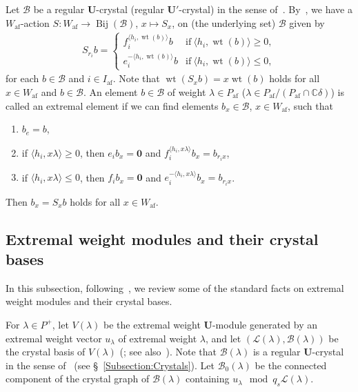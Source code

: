 \documentclass[ALCO,ThmDefs,Unicode,epreuves]{cedram}
\newcommand{\BC}{\mathbb{C}}
\newcommand\bm[1]{\boldsymbol{#1}}
\renewcommand{\U}{\mathbf{U}}
\DeclareMathOperator{\af}{af}
\DeclareMathOperator{\wt}{wt}
\DeclareMathOperator{\Bij}{Bij}
\begin{document}
Let 
$\mathcal{B}$ 
be a regular $\U$-crystal (\resp regular $\U'$-crystal) in the sense of~\cite[\S~2.2]{K02}. 
By~\cite[\S~7]{K94}, 
we have a $W_{\af}$-action 
$S : W_{\af} \rightarrow \Bij(\mathcal{B})$, $x \mapsto S_x$, 
on (the underlying set) 
$\mathcal{B}$
given by
\begin{align} \label{eq:W-action}
S_{r_i} b
=
\begin{cases}
f_i^{\langle h_i , \wt (b) \rangle} b & \text{if}\ \langle h_i , \wt (b) \rangle \geq 0, \\%
e_i^{-\langle h_i , \wt (b) \rangle} b & \text{if}\ \langle h_i , \wt (b) \rangle \leq 0, 
\end{cases}
\end{align}
for each 
$b \in \mathcal{B}$ 
and 
$i \in I_{\af}$. 
Note that 
$\wt (S_x b) = x \wt (b)$ 
holds for all
$x \in W_{\af}$ and $b \in \mathcal{B}$. 
An element 
$b \in \mathcal{B}$ 
of weight 
$\lambda \in P_{\af}$
(\resp $\lambda \in P_{\af} / (P_{\af} \cap \BC \delta)$)
is called an extremal element if we can find elements
$b_x \in \mathcal{B}$, $x \in W_{\af}$, 
such that 
\begin{enumerate}[label=(E\arabic*)]
\item
$b_e = b$, 
\item
if 
$\langle h_i , x\lambda \rangle \geq 0$, 
then
$e_i b_x = \bm{0}$
and 
$f_i^{\langle h_i , x\lambda \rangle} b_x = b_{r_i x}$, 
\item
if 
$\langle h_i , x\lambda \rangle \leq 0$, 
then
$f_i b_x = \bm{0}$
and 
$e_i^{-\langle h_i , x\lambda \rangle} b_x = b_{r_i x}$. 
\end{enumerate}
Then 
$b_x = S_x b$
holds for all 
$x \in W_{\af}$.

\subsection{Extremal weight modules and their crystal bases} \label{Subsection:extremal}

In this subsection, 
following~\cite{BN04,K94,K02}, 
we review some of the standard facts on 
extremal weight modules and their crystal bases.

For 
$\lambda \in P^+$, 
let 
$V(\lambda)$ 
be the extremal weight $\U$-module generated by an extremal weight vector 
$u_{\lambda}$ 
of extremal weight 
$\lambda$, 
and let 
$(\mathcal{L}(\lambda) , \mathcal{B}(\lambda))$ 
be the crystal basis of 
$V(\lambda)$
(\cite[Proposition~8.2.2]{K94}; see also~\cite[\S~3.2]{K02}). 
Note that 
$\mathcal{B}(\lambda)$ 
is a regular $\U$-crystal in the sense of~\cite[\S~2.2]{K02} (see \S~\ref{Subsection:Crystals}). 
Let 
$\mathcal{B}_0(\lambda)$ 
be the connected component of the crystal graph of 
$\mathcal{B}(\lambda)$
containing 
$u_{\lambda} \mod q_s \mathcal{L}(\lambda)$.
\end{document}
